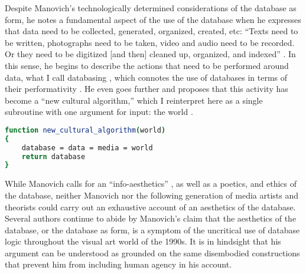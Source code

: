Despite Manovich's technologically determined considerations of the database as form, he notes a fundamental aspect of the use of the database when he expresses that data need to be collected, generated, organized, created, etc: ``Texts need to be written, photographs need to be taken, video and audio need to be recorded. Or they need to be digitized [and then] cleaned up, organized, and indexed'' \parencite[224]{Man01:The}. In this sense, he begins to describe the actions that need to be performed around data, what I call databasing , which connotes the use of databases in terms of their performativity . He even goes further and proposes that this activity has become a ``new cultural algorithm,'' \parencite[225]{Man01:The} which I reinterpret here as a single subroutine with one argument for input: the world . %

\begin{flushleft}
\small
\begin{lstlisting}[caption={Manovich's cultural algorithm as a pseudocode routine with the world as argument (i.e, as input). The world is then mediatized, stored in some media (film, tape), then digitized into data, then structured as a database. This routine returns the database, which is, henceforth, the world re-presented as database.},captionpos=b,label={lst:manovich},language=bash]
function new_cultural_algorithm(world) 
{
	database = data = media = world
	return database
}
\end{lstlisting}
\end{flushleft}

While Manovich calls for an ``info-aesthetics'' \parencite[217]{Man01:The}, as well as a poetics, and ethics of the database, neither Manovich nor the following generation of media artists and theorists could carry out an exhaustive account of an aesthetics of the database. Several authors continue to abide by Manovich's claim that the aesthetics of the database, or the database as form, is a symptom of the uncritical use of database logic throughout the visual art world of the 1990s. It is in hindsight that his argument can be understood as grounded on the same disembodied constructions that prevent him from including human agency in his account.


